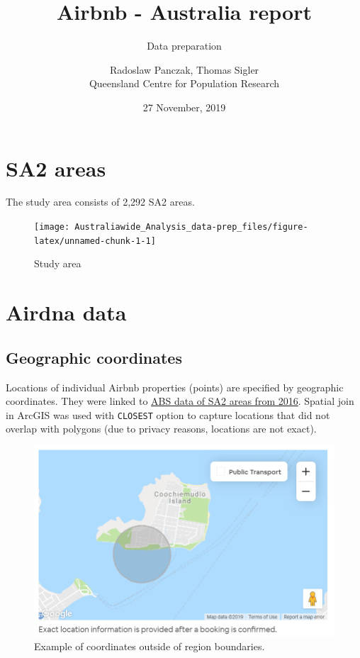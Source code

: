 \documentclass[]{article}
\title{Airbnb - Australia report}
\subtitle{Data preparation}
\author{Radoslaw Panczak, Thomas Sigler \\ Queensland Centre for Population Research}
\date{27 November, 2019}
\begin{document}
\maketitle

{
\setcounter{tocdepth}{2}
\tableofcontents
}
\newpage

\section{SA2 areas}\label{sa2-areas}

The study area consists of 2,292 SA2 areas.

\begin{figure}[H]

{\centering \texttt{[image: Australiawide\_Analysis\_data-prep\_files/figure-latex/unnamed-chunk-1-1]} 

}

\caption{Study area}\label{fig:unnamed-chunk-1}
\end{figure}

\newpage

\section{Airdna data}\label{airdna-data}

\subsection{Geographic coordinates}\label{geographic-coordinates}

Locations of individual Airbnb properties (points) are specified by
geographic coordinates. They were linked to
\href{https://www.abs.gov.au/AUSSTATS/abs@.nsf/Lookup/1270.0.55.001Main+Features10018July\%202016?OpenDocument}{ABS
data of SA2 areas from 2016}. Spatial join in ArcGIS was used with
\texttt{CLOSEST} option to capture locations that did not overlap with
polygons (due to privacy reasons, locations are not exact).

\begin{figure}[H]
\centering
\includegraphics[width=0.5\linewidth]{imprecise.PNG}
\caption{Example of coordinates outside of region boundaries.}
\end{figure}
\end{document}
